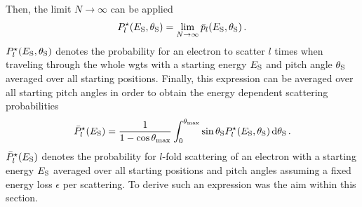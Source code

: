 Then, the limit $N\rightarrow\infty$ can be applied
\begin{equation}
  P^{\star}_l(E_\mathrm{S},\theta_\mathrm{S}) = 
    \lim_{N\rightarrow\infty} \bar{p}_l(E_\mathrm{S},\theta_\mathrm{S})
    \text{\,.}
    \label{eq:appendixEDepScatCrossSecExtendedModelFormalismPitchAngleDepScatProbs}
\end{equation}
$P^{\star}_l(E_\mathrm{S},\theta_\mathrm{S})$ denotes the probability for an electron to scatter $l$ times when traveling through the whole \gls{wgts} with a starting energy $E_\mathrm{S}$ and pitch angle $\theta_\mathrm{S}$ averaged over all starting positions. Finally, this expression can be averaged over all starting pitch angles in order to obtain the energy dependent scattering probabilities
\begin{equation}
    \bar{P}^{\star}_l(E_\mathrm{S}) = 
    \frac{1}{1-\cos\theta_\mathrm{max}}
    \int_0^{\theta_\mathrm{max}}
    	\sin \theta_\mathrm{S}
        P^{\star}_l(E_\mathrm{S},\theta_\mathrm{S}) 
        \mathop{}\!\mathrm{d} \theta_\mathrm{S}
    \text{\,.}
    \label{eq:appendixEDepScatCrossSecExtendedModelFormalismAveragedDepScatProbs}
\end{equation}
$\bar{P}^{\star}_l(E_\mathrm{S})$ denotes the probability for $l$-fold scattering of an electron with a starting energy $E_\mathrm{S}$ averaged over all starting positions and pitch angles assuming a fixed energy loss $\epsilon$ per scattering. To derive such an expression was the aim within this section. 

